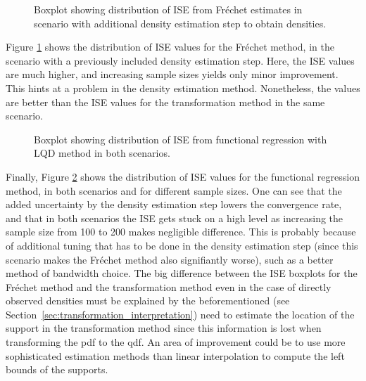 \begin{figure}[h!]
    \centering
    \resizebox{1\textwidth}{!}{}
    \caption[Simulation results: ISE boxplot --- Fréchet method with estimated densities]{Boxplot
    showing distribution of ISE from Fréchet estimates in scenario with additional
    density estimation step to obtain densities.}
    \label{fig:ise_frechet_denstimation}
\end{figure}

Figure \ref{fig:ise_frechet_denstimation} shows the distribution of ISE values for
the Fréchet method, in the scenario with a previously included density estimation step.
Here, the ISE values are much higher, and increasing sample sizes yields only minor
improvement. This hints at a problem in the density estimation method. Nonetheless,
the values are better than the ISE values for the transformation method in the same
scenario.

\begin{figure}[h!]
    \centering
    \resizebox{\textwidth}{!}{}
    \caption[Simulation results: ISE boxplot --- functional regression]{Boxplot showing
    distribution of ISE from functional regression with LQD method in both scenarios.}
    \label{fig:ise_func_reg_both}
\end{figure}

Finally, Figure \ref{fig:ise_func_reg_both} shows the distribution of ISE values for
the functional regression method, in both scenarios and for different sample sizes. One
can see that the added uncertainty by the density estimation step lowers the convergence
rate, and that in both scenarios the ISE gets stuck on a high level as increasing the
sample size from 100 to 200 makes negligible difference. This is probably
because of additional tuning that has to be done in the density estimation step (since
this scenario makes the Fréchet method also signifiantly worse), such as a better method
of bandwidth choice. The big difference between the ISE boxplots for the Fréchet method and
the transformation method even in the case of directly observed densities must be explained
by the beforementioned (see Section~\ref{sec:transformation_interpretation}) need to
estimate the location of the support in the transformation method since this information
is lost when transforming the pdf to the qdf. An area of improvement could be to use
more sophisticated estimation methods than linear interpolation to compute the left bounds
of the supports.

